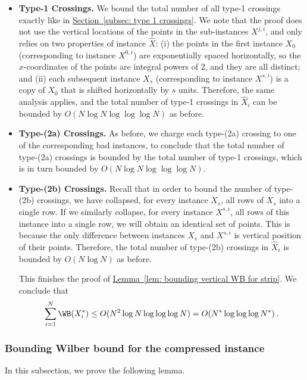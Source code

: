 \documentclass[11pt]{article}
\numberwithin{equation}{section}
\theoremstyle{definition}
\theoremstyle{plain}
\newcommand{\expref}[2]{\hyperref[#2]{#1~\ref{#2}}}
\begin{document}
\begin{itemize}
    \item {\bf Type-1 Crossings.}
We bound the total number of all type-1 crossings exactly like in \expref{Section}{subsec: type 1 crossings}. We note that the proof does not use the vertical locations of the points in the sub-instances $X^{j,i}$, and only relies on two properties of instance $\hat X$: (i) the points in the first instance $X_0$ (corresponding to instance $X^{0,i}$) are exponentially spaced horizontally, so the $x$-coordinates of the points are integral powers of $2$, and they are all distinct; and (ii) each subsequent instance $X_s$ (corresponding to instance $X^{s,i}$) is a copy of $X_0$ that is shifted horizontally by $s$ units. Therefore, the same analysis applies, and the total number of type-1 crossings in $\hat X_i$ can be bounded by $O(N\log N\log\log\log N)$ as before.

\item {\bf Type-(2a) Crossings.}
As before, we charge each type-(2a) crossing to one of the corresponding bad instances, to conclude that the total number of type-(2a) crossings is bounded by the total number of type-1 crossings, which is in turn bounded by $O(N\log N\log\log\log N)$.

\item  {\bf Type-(2b) Crossings.}
Recall that in order to bound the number of type-(2b) crossings, we have collapsed, for every instance $X_s$, all rows of $X_s$ into a single row. If we similarly collapse, for every instance $X^{s,i}$, all rows of this instance into a single row, we will obtain an identical set of points. This is because the only difference between instances $X_s$ and $X^{s,i}$ is vertical position of their points. Therefore, the total number of type-(2b) crossings in $\hat X_i$ is bounded by $O(N\log N)$ as before.

This finishes the proof of \expref{Lemma}{lem: bounding vertical WB for strip}. We conclude that %
\begin{equation}
  \sum_{i=1}^N\WB(X_i^*)\leq O(N^2\log N\log\log\log N)=O(N^*\log\log\log N^*)\,.
\end{equation}
\end{itemize}







\subsubsection{Bounding Wilber bound for the compressed instance}
In this subsection, we prove the following lemma.
\end{document}
